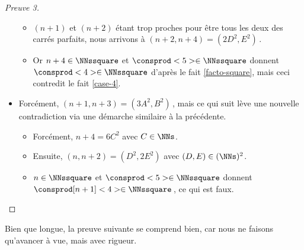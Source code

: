 \begin{proof}[Preuve 3]
\begin{itemize}
\begin{itemize}
			\item $(n+1)$ et $(n+2)$ étant trop proches pour être tous les deux des carrés parfaits, nous arrivons à $(n + 2, n + 4) = (2 D^2, E^2)$\,.

			\item Or $n + 4 \in \NNssquare$ et $\consprod<5> \in \NNssquare$ donnent $\consprod<4> \in \NNssquare$ d'après le fait \ref{facto-square}, mais ceci contredit le fait \ref{case-4}.
		\end{itemize}
	
		\item Forcément, $(n + 1, n + 3) = (3 A^2, B^2)$\,, mais ce qui suit lève une nouvelle contradiction via une démarche similaire à la précédente.
		\begin{itemize}
			\item Forcément, $n + 4 = 6 C^2$ avec $C \in \NNs$. 

			\item Ensuite, $(n, n + 2) = (D^2, 2 E^2)$ avec $(D, E) \in ( \NNs )^2$.

			\item $n \in \NNssquare$ et $\consprod<5> \in \NNssquare$ donnent $\consprod[n+1]<4> \in \NNssquare$\,, ce qui est faux.\qedhere
		\end{itemize}
    \end{itemize}
\end{proof}




Bien que longue, la preuve suivante se comprend bien, car nous ne faisons qu'avancer à vue, mais avec rigueur.


